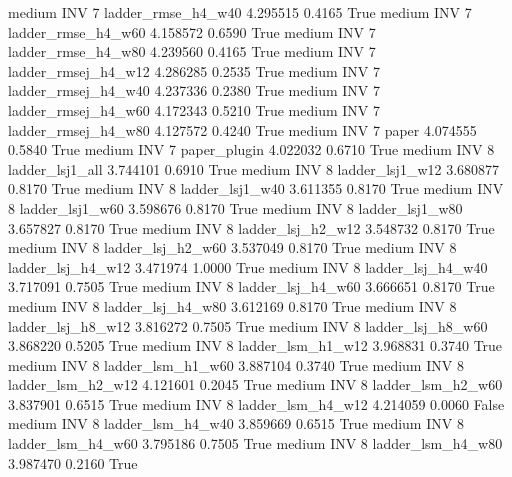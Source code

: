     medium      INV                 7  ladder_rmse_h4_w40   4.295515      0.4165    True
    medium      INV                 7  ladder_rmse_h4_w60   4.158572      0.6590    True
    medium      INV                 7  ladder_rmse_h4_w80   4.239560      0.4165    True
    medium      INV                 7 ladder_rmsej_h4_w12   4.286285      0.2535    True
    medium      INV                 7 ladder_rmsej_h4_w40   4.237336      0.2380    True
    medium      INV                 7 ladder_rmsej_h4_w60   4.172343      0.5210    True
    medium      INV                 7 ladder_rmsej_h4_w80   4.127572      0.4240    True
    medium      INV                 7               paper   4.074555      0.5840    True
    medium      INV                 7        paper_plugin   4.022032      0.6710    True
    medium      INV                 8     ladder_lsj1_all   3.744101      0.6910    True
    medium      INV                 8     ladder_lsj1_w12   3.680877      0.8170    True
    medium      INV                 8     ladder_lsj1_w40   3.611355      0.8170    True
    medium      INV                 8     ladder_lsj1_w60   3.598676      0.8170    True
    medium      INV                 8     ladder_lsj1_w80   3.657827      0.8170    True
    medium      INV                 8   ladder_lsj_h2_w12   3.548732      0.8170    True
    medium      INV                 8   ladder_lsj_h2_w60   3.537049      0.8170    True
    medium      INV                 8   ladder_lsj_h4_w12   3.471974      1.0000    True
    medium      INV                 8   ladder_lsj_h4_w40   3.717091      0.7505    True
    medium      INV                 8   ladder_lsj_h4_w60   3.666651      0.8170    True
    medium      INV                 8   ladder_lsj_h4_w80   3.612169      0.8170    True
    medium      INV                 8   ladder_lsj_h8_w12   3.816272      0.7505    True
    medium      INV                 8   ladder_lsj_h8_w60   3.868220      0.5205    True
    medium      INV                 8   ladder_lsm_h1_w12   3.968831      0.3740    True
    medium      INV                 8   ladder_lsm_h1_w60   3.887104      0.3740    True
    medium      INV                 8   ladder_lsm_h2_w12   4.121601      0.2045    True
    medium      INV                 8   ladder_lsm_h2_w60   3.837901      0.6515    True
    medium      INV                 8   ladder_lsm_h4_w12   4.214059      0.0060   False
    medium      INV                 8   ladder_lsm_h4_w40   3.859669      0.6515    True
    medium      INV                 8   ladder_lsm_h4_w60   3.795186      0.7505    True
    medium      INV                 8   ladder_lsm_h4_w80   3.987470      0.2160    True
